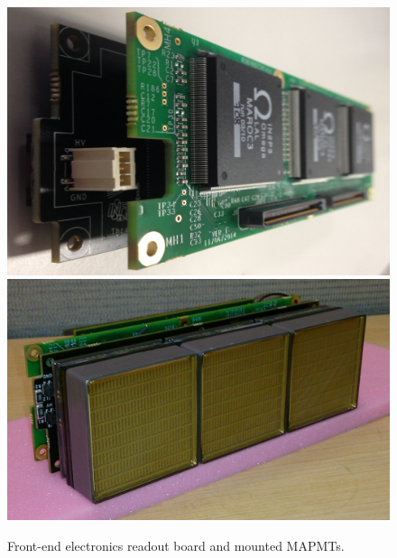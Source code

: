 \begin{figure}[htb]
  \centering
  \includegraphics[width=0.8\linewidth]{figures/fe1.pdf}
  \includegraphics[width=0.8\linewidth]{figures/frontendPMT.pdf}
  \caption{Front-end electronics readout board and mounted MAPMTs.}
  \label{fig:feboards}
\end{figure}




